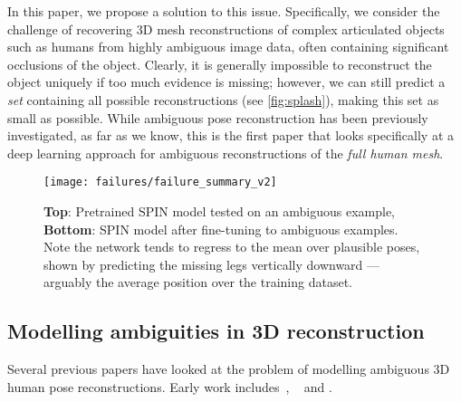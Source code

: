 In this paper, we propose a solution to this issue.
Specifically, we consider the challenge of recovering 3D mesh reconstructions of complex articulated objects such as humans from highly ambiguous image data, often containing significant occlusions of the object.
Clearly, it is generally impossible to reconstruct the object uniquely if too much evidence is missing; however, we can still predict a \emph{set} containing all possible reconstructions (see \cref{fig:splash}), making this set as small as possible.
While ambiguous pose reconstruction has been previously investigated, as far as we know, this is the first paper that looks specifically at a deep learning approach for ambiguous reconstructions of the \emph{full human mesh}.

\begin{wrapfigure}{t}{0.4\textwidth}
  \vspace{-0.3cm}
  \begin{center}
    \texttt{[image: failures/failure\_summary\_v2]} %
  \end{center}
    \vspace{-0.3cm}
    \caption{\textbf{Top}: Pretrained SPIN model tested on an ambiguous example, \textbf{Bottom}: SPIN model after fine-tuning to ambiguous examples. Note the network tends to regress to the mean over plausible poses, shown by predicting the missing legs vertically downward --- arguably the average position over the training dataset.}\label{fig:issues}
\end{wrapfigure}


\subsection{Modelling ambiguities in 3D reconstruction}

Several previous papers have looked at the problem of modelling ambiguous 3D human pose reconstructions. Early work includes~\citet{kinematic-jump-processes}, ~\citet{tracking-3d-human-figures} and \citet{density-prop}. 


